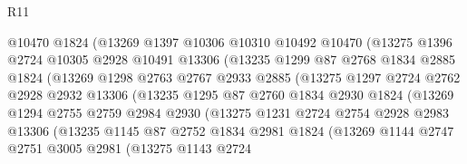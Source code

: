 \begin{lexlean}{R11}
\begin{coremodule}
                    @10470
                    @1824
                    (@13269
                      @1397
                      @10306
                      @10310
                      @10492
                      @10470
                      (@13275
                        @1396
                        @2724
                        @10305
                        @2928
                        @10491
                        @13306
                        (@13235
                          @1299
                          @87
                          @2768
                          @1834
                          @2885
                          @1824
                          (@13269
                            @1298
                            @2763
                            @2767
                            @2933
                            @2885
                            (@13275
                              @1297
                              @2724
                              @2762
                              @2928
                              @2932
                              @13306
                              (@13235
                                @1295
                                @87
                                @2760
                                @1834
                                @2930
                                @1824
                                (@13269
                                  @1294
                                  @2755
                                  @2759
                                  @2984
                                  @2930
                                  (@13275
                                    @1231
                                    @2724
                                    @2754
                                    @2928
                                    @2983
                                    @13306
                                    (@13235
                                      @1145
                                      @87
                                      @2752
                                      @1834
                                      @2981
                                      @1824
                                      (@13269
                                        @1144
                                        @2747
                                        @2751
                                        @3005
                                        @2981
                                        (@13275
                                          @1143
                                          @2724

\end{coremodule}
\end{lexlean}
